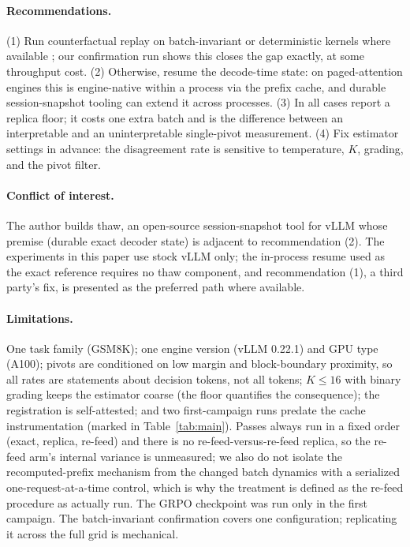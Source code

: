 \documentclass[11pt]{article}
\begin{document}
\paragraph{Recommendations.} (1) Run counterfactual replay on
batch-invariant or deterministic kernels where available
\citep{he2025nondeterminism, sglang2025deterministic}; our confirmation run
shows this closes the gap exactly, at some throughput cost. (2) Otherwise,
resume the decode-time state: on paged-attention engines this is
engine-native within a process via the prefix cache, and durable
session-snapshot tooling can extend it across processes. (3) In all cases
report a replica floor; it costs one extra batch and is the difference
between an interpretable and an uninterpretable single-pivot measurement.
(4) Fix estimator settings in advance: the disagreement rate is sensitive
to temperature, $K$, grading, and the pivot filter.

\paragraph{Conflict of interest.} The author builds thaw, an open-source
session-snapshot tool for vLLM whose premise (durable exact decoder state)
is adjacent to recommendation (2). The experiments in this paper use stock
vLLM only; the in-process resume used as the exact reference requires no
thaw component, and recommendation (1), a third party's fix, is presented
as the preferred path where available.

\paragraph{Limitations.} One task family (GSM8K); one engine version (vLLM
0.22.1) and GPU type (A100); pivots are conditioned on low margin and
block-boundary proximity, so all rates are statements about decision
tokens, not all tokens; $K \leq 16$ with binary grading keeps the estimator
coarse (the floor quantifies the consequence); the registration is
self-attested; and two first-campaign runs predate the cache
instrumentation (marked in Table~\ref{tab:main}). Passes always run in a fixed
order (exact, replica, re-feed) and there is no re-feed-versus-re-feed
replica, so the re-feed arm's internal variance is unmeasured; we also do
not isolate the recomputed-prefix mechanism from the changed batch
dynamics with a serialized one-request-at-a-time control, which is why the
treatment is defined as the re-feed procedure as actually run. The GRPO
checkpoint was run only in the first campaign. The batch-invariant
confirmation covers one configuration; replicating it across the full grid
is mechanical.
\end{document}
